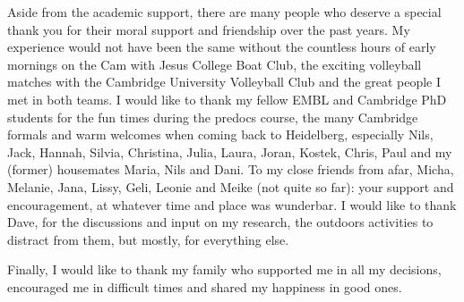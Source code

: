 Aside from the academic support, there are many people who deserve a special thank you for their moral support and friendship over the past years. My experience would not have been the same without the countless hours of early mornings on the Cam with Jesus College Boat Club, the exciting volleyball matches with the Cambridge University Volleyball Club and the great people I met in both teams. I would like to thank my fellow EMBL and Cambridge PhD students for the fun times during the predocs course, the many Cambridge formals and warm welcomes when coming back to Heidelberg, especially Nils, Jack, Hannah, Silvia, Christina, Julia, Laura, Joran, Kostek, Chris, Paul and my (former) housemates Maria, Nils and Dani. To my close friends from afar, Micha, Melanie, Jana, Lissy, Geli, Leonie and Meike (not quite so far): your support and encouragement, at whatever time and place was wunderbar. I would like to thank Dave, for the discussions and input on my research, the outdoors activities to distract from them, but mostly, for everything else. 

Finally, I would like to thank my family who supported me in all my decisions, encouraged me in difficult times and shared my happiness in good ones. 
